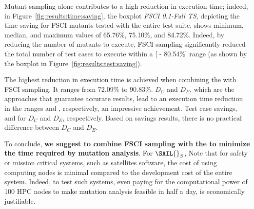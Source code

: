 
Mutant sampling alone contributes to a high reduction in execution time; indeed, in Figure~\ref{fig:results:time:saving}, the boxplot \emph{FSCI 0.1-Full TS}, depicting the time saving for FSCI mutants tested with the entire test suite, shows minimum, median, and maximum values of 65.76\%, 75.10\%, and 84.72\%. Indeed, by reducing the number of mutants to execute, FSCI sampling significantly reduced the total number of test cases to execute within a [ - 80.54\%] range (as shown by the boxplot in Figure~\ref{fig:results:test:saving}).

The highest reduction in execution time is achieved when combining the \MPTS with FSCI sampling. It ranges from 72.09\% to 90.83\%. $D_C$ and $D_E$, which are the approaches that guarantee accurate results, lead to an execution time reduction in the ranges \JMRCHANGE{[75.25\% - 90.83\%]} and \JMRCHANGE{[73.53\% - 90.83\%]}, respectively, an impressive achievement.
Test case savings,
 and \JMRCHANGE{[68.08\% - 82.70\%]} for $D_C$ and $D_E$, respectively. Based on savings results, there is no practical difference between $D_C$ and $D_E$.


To conclude, \textbf{we suggest to combine FSCI sampling with the \MPTS to minimize the time required by mutation analysis}.
For $\mathit{\SAIL{}}_S$,
 Note that for safety or mission critical systems, such as satellites software, the cost of using computing nodes is minimal compared to the development cost of the entire system. Indeed, to test such systems, even paying for the computational power of 100 HPC nodes to make mutation analysis feasible in half a day, is economically justifiable. 

